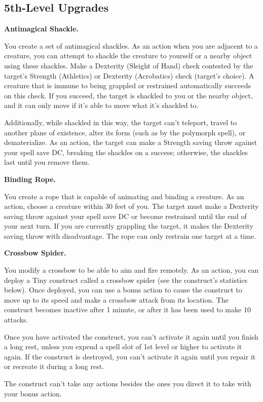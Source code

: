 \documentclass[11pt,twoside,openany]{book}  %
\begin{document}
\subsection{5th-Level Upgrades}
\begin{fiveitemize}

	\item \textbf{Antimagical Shackle.}
	
	You create a set of antimagical shackles. As an action when you are adjacent to a creature, you can attempt to shackle the creature to yourself or a nearby object using these shackles. Make a Dexterity (Sleight of Hand) check contested by the target’s Strength (Athletics) or Dexterity (Acrobatics) check (target’s choice). A creature that is immune to being grappled or restrained automatically succeeds on this check. If you succeed, the target is shackled to you or the nearby object, and it can only move if it’s able to move what it’s shackled to.

	Additionally, while shackled in this way, the target can’t teleport, travel to another plane of existence, alter its form (such as by the polymorph spell), or dematerialize. As an action, the target can make a Strength saving throw against your spell save DC, breaking the shackles on a success; otherwise, the shackles last until you remove them.

	\item \textbf{Binding Rope.}
	
	You create a rope that is capable of animating and binding a creature. As an action, choose a creature within 30 feet of you. The target must make a Dexterity saving throw against your spell save DC or become restrained until the end of your next turn. If you are currently grappling the target, it makes the Dexterity saving throw with disadvantage. The rope can only restrain one target at a time.

	\item \textbf{Crossbow Spider.}
	
	You modify a crossbow to be able to aim and fire remotely. As an action, you can deploy a Tiny construct called a crossbow spider (see the construct’s statistics below). Once deployed, you can use a bonus action to cause the construct to move up to its speed and make a crossbow attack from its location. The construct becomes inactive after 1 minute, or after it has been used to make 10 attacks.

	Once you have activated the construct, you can’t activate it again until you finish a long rest, unless you expend a spell slot of 1st level or higher to activate it again. If the construct is destroyed, you can’t activate it again until you repair it or recreate it during a long rest.

	The construct can’t take any actions besides the ones you direct it to take with your bonus action.
\end{fiveitemize}
\end{document}

